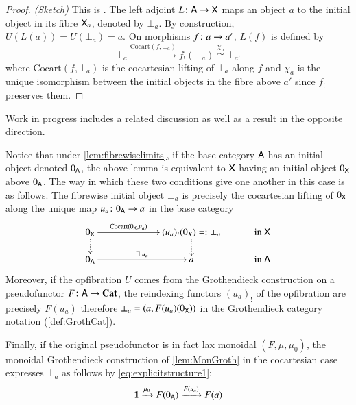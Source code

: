 \documentclass[reqno]{amsart}
\begin{document}
\begin{proof}\emph{(Sketch)}
 This is \cite[Proposition~4.4]{Gray}. The left adjoint $L\colon\mathsf{A}\to\mathsf{X}$ maps an object $a$ to the initial object in its fibre $\mathsf{X}_a$, denoted by $\bot_a$. By construction, $U(L(a))=U(\bot_a)=a$. On morphisms $f\colon a\to a'$, $L(f)$ is defined by
 \begin{equation}\label{eq:Lonarrows}
  \bot_a\xrightarrow{\mathrm{Cocart}(f,\bot_a)}f_!(\bot_a)\stackrel{\chi_a}{\cong}\bot_{a'}
 \end{equation}
where $\mathrm{Cocart}(f,\bot_a)$ is the cocartesian lifting of $\bot_a$ along $f$ and $\chi_a$ is the unique isomorphism between the initial objects in the fibre above $a'$ since $f_!$ preserves them.
\end{proof}

Work in progress \cite{CV} includes a related discussion as well as a result in the opposite direction.

\begin{rmk}\label{rmk:important}
Notice that under \cref{lem:fibrewiselimits}, if the base category $\mathsf{A}$ has an initial object denoted $0_{\mathsf{A}}$, the above lemma is equivalent to $\mathsf{X}$ having an initial object $0_{\mathsf{X}}$ above $0_{\mathsf{A}}$. The way in which these two conditions give one another in this case is as follows. 
The fibrewise initial object $\bot_a$ is precisely the cocartesian lifting of $0_{\mathsf{X}}$ along the unique map $u_a\colon0_{\mathsf{A}}\to a$ in the base category
\begin{displaymath}
\xymatrix @C=.4in @R=.2in
{0_\X \ar @{.>}[d]\ar[rr]^-{\mathrm{Cocart}(0_\X,u_a)} && (u_a)_!(0_X)=:\bot_a\ar @{.>}[d] & \textrm{in }\X  \\
0_\A\ar[rr]^-{\exists!u_a} && a & \textrm{in }\A}
\end{displaymath}
Moreover, if the opfibration $U$ comes from the Grothendieck construction on a pseudofunctor $F\colon\mathsf{A}\to\mathbf{Cat}$, the reindexing functors $(u_a)_!$ of the opfibration are precisely $F(u_a)$ therefore $\bot_a=(a,F(u_a)(0_{\mathsf{X}}))$ in the Grothendieck category notation (\cref{def:GrothCat}).

Finally, if the original pseudofunctor is in fact lax monoidal $(F,\mu,\mu_0)$, the monoidal Grothendieck construction of \cref{lem:MonGroth} in the cocartesian case expresses $\bot_a$ as follows by \cref{eq:explicitstructure1}:
\begin{equation}\label{eq:initialinfibre}
\mathbf{1}\xrightarrow{\mu_0}F(0_{\mathsf{A}})\xrightarrow{F(u_a)}F(a) 
\end{equation}
\end{rmk}
\end{document}
